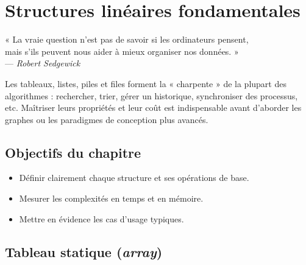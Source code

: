 
\chapter{Structures linéaires fondamentales}


\begin{flushright}\small
« La vraie question n’est pas de savoir si les ordinateurs pensent, \\
mais s’ils peuvent nous aider à mieux organiser nos données. »\\[-0.2em]
— \textit{Robert Sedgewick}
\end{flushright}

Les tableaux, listes, piles et files forment la « charpente » de la plupart
des algorithmes : rechercher, trier, gérer un historique, synchroniser des
processus, etc.  Maîtriser leurs propriétés et leur coût est indispensable
avant d’aborder les graphes ou les paradigmes de conception plus avancés.

\section*{Objectifs du chapitre}
\begin{itemize}[label=\small$\blacktriangleright$]
  \item Définir clairement chaque structure et ses opérations de base.
  \item Mesurer les complexités en temps et en mémoire.
  \item Mettre en évidence les cas d’usage typiques.
\end{itemize}\vspace{0.4em}

\section{Tableau statique (\textit{array})}

